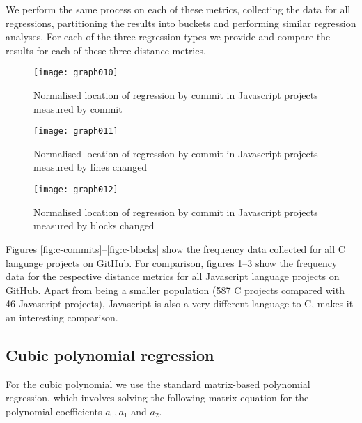 \documentclass[10pt,journal,compsoc]{IEEEtran}
\begin{document}
We perform the same process on each of these metrics, collecting the data for all regressions, partitioning the results into buckets and performing similar regression analyses. For each of the three regression types we provide and compare the results for each of these three distance metrics.

\begin{figure}[t]
\centering
\texttt{[image: graph010]}%
\caption{\label{fig:javascript-commits}Normalised location of regression by commit in Javascript projects measured by commit}
\end{figure}

\begin{figure}[t]
\centering
\texttt{[image: graph011]}%
\caption{\label{fig:javascript-lines}Normalised location of regression by commit in Javascript projects measured by lines changed}
\end{figure}

\begin{figure}[t]
\centering
\texttt{[image: graph012]}%
\caption{\label{fig:javascript-blocks}Normalised location of regression by commit in Javascript projects measured by blocks changed}
\end{figure}

Figures \ref{fig:c-commits}--\ref{fig:c-blocks} show the frequency data collected for all C language projects on GitHub. For comparison, figures \ref{fig:javascript-commits}--\ref{fig:javascript-blocks} show the frequency data for the respective distance metrics for all Javascript language projects on GitHub. Apart from being a smaller population (587 C projects compared with 46 Javascript projects), Javascript is also a very different language to C, makes it an interesting comparison.

\subsection{Cubic polynomial regression}

For the cubic polynomial we use the standard matrix-based polynomial regression, which involves solving the following matrix equation for the polynomial coefficients $a_0, a_1$ and $a_2$.
\end{document}

